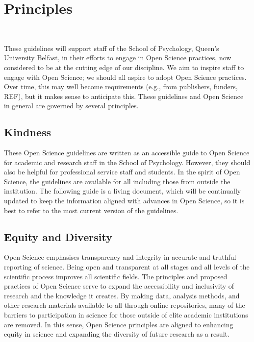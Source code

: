 \documentclass[
  letterpaper,
  DIV=11,
  numbers=noendperiod]{scrreprt}
\author{}
\date{}
\begin{document}
\ifdefined\Shaded\renewenvironment{Shaded}{\begin{tcolorbox}[frame hidden, sharp corners, enhanced, borderline west={3pt}{0pt}{shadecolor}, interior hidden, boxrule=0pt, breakable]}{\end{tcolorbox}}\fi

\hypertarget{Principles}{%
\chapter*{Principles~}\label{Principles}}

~

These guidelines will support staff of the School of Psychology, Queen's
University Belfast, in their efforts to engage in Open Science
practices, now considered to be at the cutting edge of our discipline.
We aim to inspire staff to engage with Open Science; we should all
aspire to adopt Open Science practices. Over time, this may well become
requirements (e.g., from publishers, funders, REF), but it makes sense
to anticipate this. These guidelines and Open Science in general are
governed by several principles.~

\hypertarget{kindness}{%
\section{Kindness~}\label{kindness}}

These Open Science guidelines are written as an accessible guide to Open
Science for academic and research staff in the School of Psychology.
However, they should also be helpful for professional service staff and
students. In the spirit of Open Science, the guidelines are available
for all including those from outside the institution. The following
guide is a living document, which will be continually updated to keep
the information aligned with advances in Open Science, so it is best to
refer to the most current version of the guidelines.~

\hypertarget{equity-and-diversity}{%
\section{Equity and Diversity~}\label{equity-and-diversity}}

Open Science emphasises transparency and integrity in accurate and
truthful reporting of science. Being open and transparent at all stages
and all levels of the scientific process improves all scientific fields.
The principles and proposed practices of Open Science serve to expand
the accessibility and inclusivity of research and the knowledge it
creates. By making data, analysis methods, and other research materials
available to all through online repositories, many of the barriers to
participation in science for those outside of elite academic
institutions are removed. In this sense, Open Science principles are
aligned to enhancing equity in science and expanding the diversity of
future research as a result.~
\end{document}
